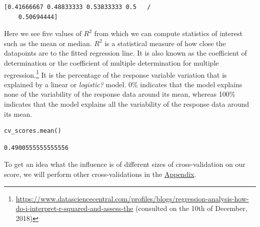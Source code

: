 \documentclass[11pt]{article}
\begin{document}
\begin{verbatim}
[0.41666667 0.48833333 0.53833333 0.5   /
    0.50694444]

\end{verbatim}

Here we see five values of \(R^{2}\) from which we can compute statistics of interest such as the mean or median. \(R^{2}\) is a statistical measure of how close the datapoints are to the fitted regression line. It is also known as the coefficient of determination or the coefficient of multiple determination for multiple regression.\footnote{\url{https://www.datasciencecentral.com/profiles/blogs/regression-analysis-how-do-i-interpret-r-squared-and-assess-the} (consulted on the 10th of December, 2018)} It is the percentage of the response variable variation that is explained by a linear or \emph{logistic?} model. 0\% indicates that the model explains none of the variability of the response data around its mean, whereas 100\% indicates that the model explains all the variability of the response data around its mean. 


\begin{verbatim}
cv_scores.mean()
\end{verbatim}

\begin{verbatim}
0.4900555555555556
\end{verbatim}

To get an idea what the influence is of different sizes of cross-validation on our score, we will perform other cross-validations in the \hyperref[sec:appendix]{Appendix}.  
\end{document}
